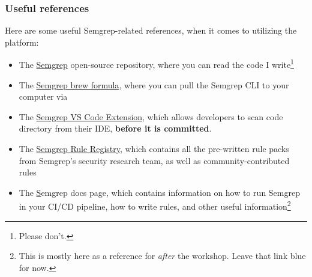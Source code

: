 \documentclass[aspectratio=169, handout]{beamer}
\begin{document}
\begin{frame}[fragile]
  \frametitle{Useful references}

  Here are some useful Semgrep-related references, when it comes to utilizing the platform:

  \pause
  \vspace{5pt}

  \begin{itemize}
    \item The {\color{blue}\href{https://github.com/semgrep/semgrep}{Semgrep}} open-source repository, where
    you can read the code I write\footnote{Please don't.}
    \item The {\color{blue}\href{https://formulae.brew.sh/formula/semgrep}{Semgrep brew formula}}, where you can
    pull the Semgrep CLI to your computer via 
    \item The {\color{blue}\href{https://marketplace.visualstudio.com/items?itemName=Semgrep.semgrep}{Semgrep VS Code Extension}},
    which allows developers to scan code directory from their IDE, \textbf{before it is committed}.
    \item The {\color{blue}\href{https://semgrep.dev/r}{Semgrep Rule Registry}}, which contains
    all the pre-written rule packs from Semgrep's security research team, as well as community-contributed
    rules
    \item The {\color{blue}\href{https://semgrep.dev/docs/}Semgrep docs page}, which contains
    information on how to run Semgrep in your CI/CD pipeline, how to write rules, and other
    useful information\footnote{This is mostly here as a reference for \textit{after} the workshop. Leave
    that link blue for now.}
  \end{itemize}
\end{frame}
\end{document}
